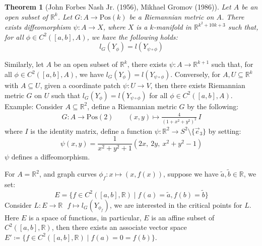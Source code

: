 \documentclass[11pt,oneside]{book}
\theoremstyle{break}
\theoremstyle{break}
\newtheorem{thm}{Theorem}[section]
\newcommand{\R}{\mathbb{R}}
\newcommand{\that}[1]{\widetilde{#1}}
\newcommand{\example}{\color{green}Example: \color{black}}
\begin{document}
\begin{thm}[John Forbes Nash Jr. (1956), Mikhael Gromov (1986)]
Let $A$ be an open subset of $\R^k$. Let $G:A \to \text{Pos}(k)$ be a Riemannian metric on $A$. There exists diffeomorphism $\psi : A \to X$, where $X$ is a $k$-manifold in $\R^{k^2 + 10k +3}$ such that, for all $\phi\in C^2([a,b],A)$, we have the following holds:
$$ l_G(Y_\phi) = l(Y_{\psi \circ \phi})$$
\end{thm}
Similarly, let $A$ be an open subset of $\R^k$, there exists $\psi : A \to \R^{k+1}$ such that, for all $\phi\in C^2([a,b],A)$, we have $ l_G(Y_\phi) = l(Y_{\psi \circ \phi})$. Conversely, for $A,U \subseteq \R^k$ with $A \subseteq U$, given a coordinate patch $\psi: U \to V$, then there exists Riemannian metric $G$ on $U$ such that $ l_G(Y_\phi) = l(Y_{\psi \circ \phi})$ for all $\phi \in  C^2([a,b],A)$.\\

\example
Consider $A\subseteq \R^2$, define a Riemannian metric $G$ by the following:
\begin{align*}
G:A\to \text{Pos}(2) \qquad (x,y)\mapsto\frac{4}{(1+x^2 + y^2)^2}\, I
\end{align*} 
where $I$ is the identity matrix, define a function $\psi:\R^2 \to S^2\setminus \{\vec{e}_3\}$ by setting: 
$$\psi(x,y) = \frac{1}{x^2 + y^2 + 1}(2x,\ 2y,\ x^2 +y^2 -1)$$ 
$\psi$ defines a diffeomorphism. 


\newpage
For $A = \R^2$, and graph curves $\phi_f : x \mapsto (x,f(x))$, suppose we have $\that{a},\that{b} \in \R$, we set: 
$$E = \{ f\in C^2([a,b], \R)\mid f(a) = \that{a}, f(b) = \that{b}\}$$ Consider $L:E \to \R \ \ \ f\mapsto l_G(Y_{\phi_f})$, we are interested in the critical points for $L$.\\

Here $E$ is a space of functions, in particular, $E$ is an affine subset of $C^2([a,b],\R)$, then there exists an associate vector space $E' \coloneqq \{f \in C^2([a,b], \R) \mid f(a) = 0 = f(b)\}$. \\
\end{document}
